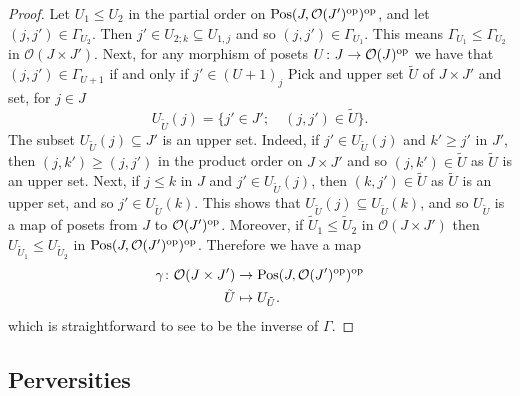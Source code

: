 \documentclass{article}
\theoremstyle{definition}
\newcommand{\Oo}{\mathcal{O}}
\newcommand{\pos}{\textnormal{Pos}}
\newcommand{\op}{\textnormal{op}}
\newcommand{\gr}{\Gamma}
\begin{document}
\begin{proof}
Let $U_1\leq U_2$ in the partial order on $\pos(J,\Oo(J')^\op)^\op$, and let $(j,j')\in \gr_{U_2}$. Then $j'\in U_{2;k}\subseteq U_{1,j}$ and so $(j,j')\in \gr_{U_1}$. This means $\gr_{U_1}\leq \gr_{U_2}$ in $\Oo(J \times J')$. Next, for any morphism of posets $U\colon J\to \Oo(J)^\op$ we have that $(j,j')\in \Gamma_{U+1}$ if and only if $j'\in (U+1)_j$
  Pick and upper set $\tilde{U}$ of $J \times J'$ and set, for $j \in J$ $$U_{\tilde{U}}(j)=\{ j' \in J'; \quad  (j,j') \in \tilde{U} \}.$$
  The subset $U_{\tilde{U}}(j)\subseteq J'$ is an upper set. Indeed, if $j'\in U_{\tilde{U}}(j)$ and $k'\geq j'$ in $J'$, then $(j,k')\geq (j,j')$ in the product order on $J\times J'$ and so $(j,k')\in \tilde{U}$ as $\tilde{U}$ is an upper set. Next, if $j\leq k$ in $J$ and $j'\in U_{\tilde{U}}(j)$, then $(k,j')\in \tilde{U}$ as $\tilde{U}$ is an upper set, and so $j'\in U_{\tilde{U}}(k)$. This shows that $U_{\tilde{U}}(j)\subseteq U_{\tilde{U}}(k)$, and so $U_{\tilde{U}}$ is a map of posets from $J$ to $\Oo(J')^\op$. Moreover, if $\tilde{U}_1\leq \tilde{U}_2$ in $\Oo(J\times J')$ then $U_{\tilde{U}_1}\leq U_{\tilde{U}_2}$ in $\pos(J,\Oo(J')^\op)^\op$. Therefore we have a map
   \begin{align*}
\gamma\colon   \Oo(J \times J') &\to \pos(J,\Oo(J')^\op)^\op \\
  \tilde{U} & \mapsto U_{\tilde{U}}.
  \end{align*}
  which is straightforward to see to be the inverse of $\gr$. 
\end{proof}

\subsection{Perversities}
\end{document}
